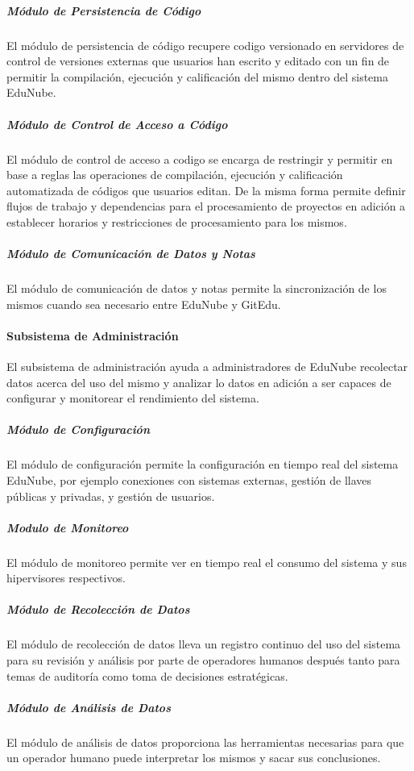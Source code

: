 \subparagraph{Módulo de Persistencia de Código}
El módulo de persistencia de código recupere codigo versionado en servidores de control de versiones externas que usuarios han escrito y editado con un fin de permitir la compilación, ejecución y calificación del mismo dentro del sistema EduNube.

\subparagraph{Módulo de Control de Acceso a Código}
El módulo de control de acceso a codigo se encarga de restringir y permitir en base a reglas las operaciones de compilación, ejecución y calificación automatizada de códigos que usuarios editan. De la misma forma permite definir flujos de trabajo y dependencias para el procesamiento de proyectos en adición a establecer horarios y restricciones de procesamiento para los mismos.

\subparagraph{Módulo de Comunicación de Datos y Notas}
El módulo de comunicación de datos y notas permite la sincronización de los mismos cuando sea necesario entre EduNube y GitEdu.

\paragraph{Subsistema de Administración}
El subsistema de administración ayuda a administradores de EduNube recolectar datos acerca del uso del mismo y analizar lo datos en adición a ser capaces de configurar y monitorear el rendimiento del sistema.

\subparagraph{Módulo de Configuración}
El módulo de configuración permite la configuración en tiempo real del sistema EduNube, por ejemplo conexiones con sistemas externas, gestión de llaves públicas y privadas, y gestión de usuarios.

\subparagraph{Modulo de Monitoreo}
El módulo de monitoreo permite ver en tiempo real el consumo del sistema y sus hipervisores respectivos.

\subparagraph{Módulo de Recolección de Datos}
El módulo de recolección de datos lleva un registro continuo del uso del sistema para su revisión y análisis por parte de operadores humanos después tanto para temas de auditoría como toma de decisiones estratégicas.

\subparagraph{Módulo de Análisis de Datos}
El módulo de análisis de datos proporciona las herramientas necesarias para que un operador humano puede interpretar los mismos y sacar sus conclusiones.

